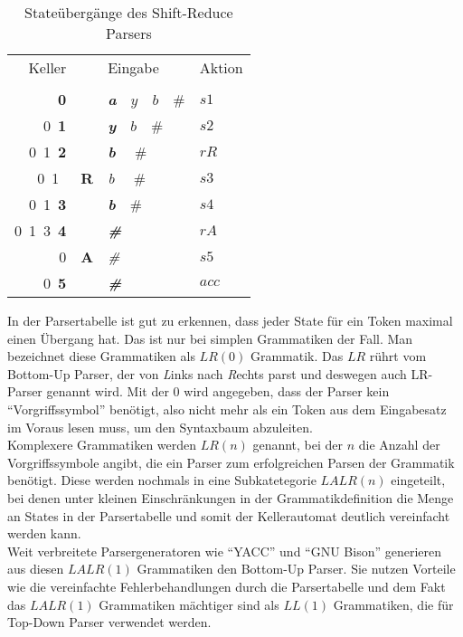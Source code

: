\begin{table}[H]
  \centering
  \begin{tabular}{r|l|l|l}
    Keller                   &             &  Eingabe                        & Aktion                    \\
    \qquad\qquad\qquad\qquad &             &  \qquad\qquad\qquad\qquad\qquad                        & \qquad                    \\
               \textbf{0}    &             &  \textit{\textbf{a}}\ \ $y$\ \ $b$\ \ $\#$ & $s1$                   \\
    0\         \textbf{1}    &             &  \textit{\textbf{y}}\ \ $b$\ \ $\#$      & $s2$                   \\
    0\ 1\      \textbf{2}    &             &  \textit{\textbf{b}} \ \ $\#$                    & $rR$       \\
    0\ 1\                    & \textbf{R}  &  \textit{b} \ \ $\#$                    & $s3$       \\
    0\ 1\      \textbf{3}    &             &  \textit{\textbf{b}}\ \ $\#$           & $s4$                   \\
    0\ 1\ 3\   \textbf{4}    &             &  \textit{\textbf{\#}}           & $rA$                   \\
                       0     & \textbf{A}  &  \textit{\#}           & $s5$                   \\
    0\         \textbf{5}    &             &  \textit{\textbf{\#}}                          & $acc$
  \end{tabular}
  \caption{Stateübergänge des Shift-Reduce Parsers}
  \label{fig:theory:parser:shiftreducestate}
\end{table}

In der Parsertabelle ist gut zu erkennen, dass jeder State für ein Token maximal einen Übergang hat.
Das ist nur bei simplen Grammatiken der Fall.
Man bezeichnet diese Grammatiken als $LR(0)$ Grammatik.
Das $LR$ rührt vom Bottom-Up Parser, der von \textit{L}inks nach \textit{R}echts parst und deswegen auch LR-Parser genannt wird. 
Mit der $0$ wird angegeben, dass der Parser kein ``Vorgriffssymbol'' benötigt, also nicht mehr als ein Token aus dem Eingabesatz im Voraus lesen muss, um den Syntaxbaum abzuleiten.\\
Komplexere Grammatiken werden $LR(n)$ genannt, bei der $n$ die Anzahl der Vorgriffssymbole angibt, die ein Parser zum erfolgreichen Parsen der Grammatik benötigt.
Diese werden nochmals in eine Subkatetegorie $LALR(n)$ eingeteilt, bei denen unter kleinen Einschränkungen in der Grammatikdefinition die Menge an States in der Parsertabelle und somit der Kellerautomat deutlich vereinfacht werden kann.\\
Weit verbreitete Parsergeneratoren wie ``YACC'' und ``GNU Bison'' generieren aus diesen $LALR(1)$ Grammatiken den Bottom-Up Parser.
Sie nutzen Vorteile wie die vereinfachte Fehlerbehandlungen durch die Parsertabelle und dem Fakt das $LALR(1)$ Grammatiken mächtiger sind als $LL(1)$ Grammatiken, die für Top-Down Parser verwendet werden.\\
